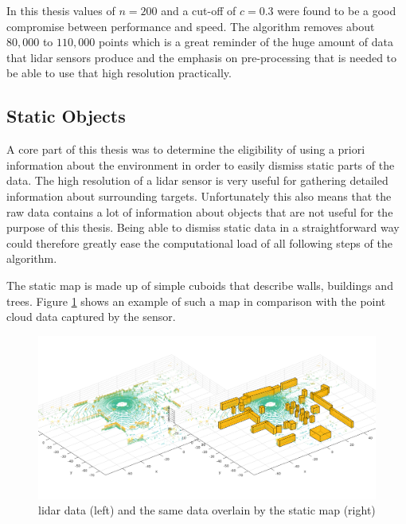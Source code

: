 In this thesis values of $n=200$ and a cut-off of $c=0.3$ were found to be a good compromise between performance and speed. The algorithm removes about $80,000$ to $110,000$ points which is a great reminder of the huge amount of data that lidar sensors produce and the emphasis on pre-processing that is needed to be able to use that high resolution practically.

\subsection{Static Objects}
A core part of this thesis was to determine the eligibility of using a priori information about the environment in order to easily dismiss static parts of the data. The high resolution of a lidar sensor is very useful for gathering detailed information about surrounding targets. Unfortunately this also means that the raw data contains a lot of information about objects that are not useful for the purpose of this thesis. Being able to dismiss static data in a straightforward way could therefore greatly ease the computational load of all following steps of the algorithm.

The static map is made up of simple cuboids that describe walls, buildings and trees. Figure \ref{fig:static_map_campus} shows an example of such a map in comparison with the point cloud data captured by the sensor. 

\begin{figure}[H]
\centering
\includegraphics[width = \textwidth]{include/images/static_map_campus.png}
\caption{lidar data (left) and the same data overlain by the static map (right)\protect\footnotemark}
\label{fig:static_map_campus}
\end{figure}

